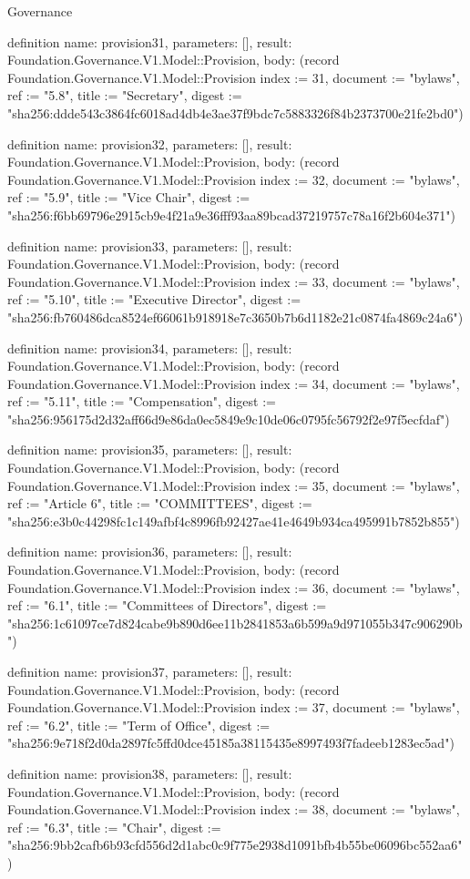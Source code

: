 \begin{lexlean}{Governance}
\begin{semanticmodule}
definition{
  name: provision31,
  parameters: [],
  result: Foundation.Governance.V1.Model::Provision,
  body: (record Foundation.Governance.V1.Model::Provision {index := 31, document := "bylaws", ref := "5.8", title := "Secretary", digest := "sha256:ddde543c3864fc6018ad4db4e3ae37f9bdc7c5883326f84b2373700e21fe2bd0"})
}

definition{
  name: provision32,
  parameters: [],
  result: Foundation.Governance.V1.Model::Provision,
  body: (record Foundation.Governance.V1.Model::Provision {index := 32, document := "bylaws", ref := "5.9", title := "Vice Chair", digest := "sha256:f6bb69796e2915cb9e4f21a9e36fff93aa89bcad37219757c78a16f2b604e371"})
}

definition{
  name: provision33,
  parameters: [],
  result: Foundation.Governance.V1.Model::Provision,
  body: (record Foundation.Governance.V1.Model::Provision {index := 33, document := "bylaws", ref := "5.10", title := "Executive Director", digest := "sha256:fb760486dca8524ef66061b918918e7c3650b7b6d1182e21c0874fa4869c24a6"})
}

definition{
  name: provision34,
  parameters: [],
  result: Foundation.Governance.V1.Model::Provision,
  body: (record Foundation.Governance.V1.Model::Provision {index := 34, document := "bylaws", ref := "5.11", title := "Compensation", digest := "sha256:956175d2d32aff66d9e86da0ec5849e9c10de06c0795fc56792f2e97f5ecfdaf"})
}

definition{
  name: provision35,
  parameters: [],
  result: Foundation.Governance.V1.Model::Provision,
  body: (record Foundation.Governance.V1.Model::Provision {index := 35, document := "bylaws", ref := "Article 6", title := "COMMITTEES", digest := "sha256:e3b0c44298fc1c149afbf4c8996fb92427ae41e4649b934ca495991b7852b855"})
}

definition{
  name: provision36,
  parameters: [],
  result: Foundation.Governance.V1.Model::Provision,
  body: (record Foundation.Governance.V1.Model::Provision {index := 36, document := "bylaws", ref := "6.1", title := "Committees of Directors", digest := "sha256:1c61097ce7d824cabe9b890d6ee11b2841853a6b599a9d971055b347c906290b"})
}

definition{
  name: provision37,
  parameters: [],
  result: Foundation.Governance.V1.Model::Provision,
  body: (record Foundation.Governance.V1.Model::Provision {index := 37, document := "bylaws", ref := "6.2", title := "Term of Office", digest := "sha256:9e718f2d0da2897fc5ffd0dce45185a38115435e8997493f7fadeeb1283ec5ad"})
}

definition{
  name: provision38,
  parameters: [],
  result: Foundation.Governance.V1.Model::Provision,
  body: (record Foundation.Governance.V1.Model::Provision {index := 38, document := "bylaws", ref := "6.3", title := "Chair", digest := "sha256:9bb2cafb6b93cfd556d2d1abc0c9f775e2938d1091bfb4b55be06096bc552aa6"})
}


\end{semanticmodule}
\end{lexlean}
